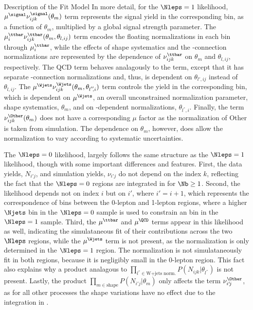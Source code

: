 \begin{section}{Description of the Fit Model}
In more detail, for the $\Nleps = 1$ likelihood, $\mu^{\signal}\nu^{\signal}_{ijk}(\theta_m)$ term represents the signal yield in the corresponding bin, as a function of $\theta_m$, multiplied by a global signal strength parameter.
The $\mu^{\ttbar}_{i}\nu^{\ttbar}_{ijk}(\theta_m, \theta_{l,ij})$ term encodes the floating normalizations in each \Njets bin through $\mu^{\ttbar}_{i}$, while the effects of shape systematics and the \MJ-connection normalizations are represented by the dependence of $\nu^{\ttbar}_{ijk}$ on $\theta_m$ and $\theta_{l,ij}$, respectively.
The QCD term behaves analagously to the \ttbar term, except that it has separate \MJ-connection normalizations and, thus, is dependent on $\theta_{l'\!,ij}$ instead of $\theta_{l,ij}$.
The $\mu^{\Wjets}\nu^{\Wjets}_{ijk}(\theta_m, \theta_{l^{''}\!\!,i})$ term controls the \Wjets yield in the corresponding bin, which is dependent on $\mu^{\Wjets}$, an overall unconstrained normalization parameter, shape systematics, $\theta_m$, and on \Njets-dependent normalizations, $\theta_{l^{''}\!\!,i}$.
Finally, the term $\nu^{\Other}_{ijk}(\theta_m)$ does not have a corresponding $\mu$ factor as the normalization of Other is taken from simulation.
The dependence on $\theta_m$, however, does allow the normalization to vary according to systematic uncertainties.

The $\Nleps = 0$ likelihood, largely follows the same structure as the $\Nleps = 1$ likelihood, though with some important differences and features.
First, the data yields, $N_{i'\!j}$, and simulation yields, $\nu_{i'\!j}$ do not depend on the index $k$, reflecting the fact that the $\Nleps = 0$ regions are integrated in \Nb for $\Nb \geq 1$.
Second, the likelihood depends not on index $i$ but on $i'$, where $i' = i + 1$, which represents the correspondence of \Njets bins between the 0-lepton and 1-lepton regions, where a higher $\Njets$ bin in the $\Nleps = 0$ sample is used to constrain an \Njets bin in the $\Nleps = 1$ sample.
Third, the $\mu^{\ttbar}$ and $\mu^{\QCD}$ terms appear in this likelihood as well, indicating the simulataneous fit of their contributions across the two $\Nleps$ regions, while the $\mu^{\Wjets}$ term is not present, as the \Wjets normalization is only determined in the $\Nleps = 1$ region.
The \Wjets normalization is not simulataneously fit in both \Nleps regions, because it is negligibly small in the 0-lepton region.
This fact also explains why a product analagous to $\displaystyle \prod_{l^{''}\!\in\text{W+jets norm.}} P(N_{ijk}|\theta_{l^{''}})$ is not present.
Lastly, the product $\displaystyle \prod_{m\in\text{shape}} P(N_{i'\!j}|\theta_{m})$ only affects the term $\nu^{\Other}_{i'\!j}$, as for all other processes the shape variations have no effect due to the integration in \Nb.

\end{section}


